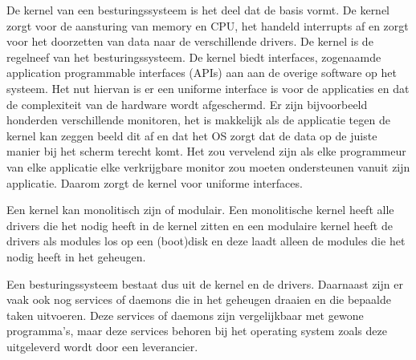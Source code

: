 De kernel van een besturingssysteem is het deel dat de basis vormt. De kernel zorgt voor de aansturing van memory en CPU, het handeld interrupts af en zorgt voor het doorzetten van data naar de verschillende drivers. De kernel is de regelneef van het besturingssysteem. De kernel biedt interfaces, zogenaamde application programmable interfaces (APIs) aan aan de overige software op het systeem. Het nut hiervan is er een uniforme interface is voor de applicaties en dat de complexiteit van de hardware wordt afgeschermd. Er zijn bijvoorbeeld honderden verschillende monitoren, het is makkelijk als de applicatie tegen de kernel kan zeggen beeld dit af en dat het OS zorgt dat de data op de juiste manier bij het scherm terecht komt. Het zou vervelend zijn als elke programmeur van elke applicatie elke verkrijgbare monitor zou moeten ondersteunen vanuit zijn applicatie. Daarom zorgt de kernel voor uniforme interfaces.

Een kernel kan monolitisch zijn of modulair. Een monolitische kernel heeft alle drivers die het nodig heeft in de kernel zitten en een modulaire kernel heeft de drivers als modules los op een (boot)disk en deze laadt alleen de modules die het nodig heeft in het geheugen.

Een besturingssysteem bestaat dus uit de kernel en de drivers. Daarnaast zijn er vaak ook nog services of daemons die in het geheugen draaien en die bepaalde taken uitvoeren. Deze services of daemons zijn vergelijkbaar met gewone programma's, maar deze services behoren bij het operating system zoals deze uitgeleverd wordt door een leverancier.

